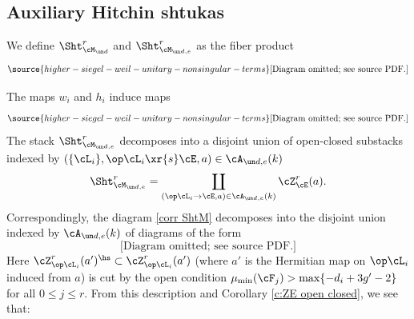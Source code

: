 


\subsection{Auxiliary Hitchin shtukas}
We define $\Sht^{r}_{\cM_{\un d}}$ and $\Sht^{r}_{\cM_{\un d,e}}$ as the fiber product
\begin{equation}\label{defn ShtMde}
\source{higher-siegel-weil-unitary-nonsingular-terms}
\text{[Diagram omitted; see source PDF.]}
\end{equation}

The maps $w_{i}$ and $h_{i}$ induce maps
\begin{equation}\label{corr ShtM}
\source{higher-siegel-weil-unitary-nonsingular-terms}
\text{[Diagram omitted; see source PDF.]}
\end{equation}
The stack $\Sht^{r}_{\cM_{\un d,e}}$ decomposes into a disjoint union of open-closed substacks indexed by $(\{\cL_{i}\}, \op\cL_{i}\xr{s} \cE, a)\in \cA_{\un d,e}(k)$
\begin{equation}
\Sht^{r}_{\cM_{\un d,e}}=\coprod_{(\op\cL_{i}\to \cE, a)\in \cA_{\un d,e}(k)}\cZ^{r}_{\cE}(a).
\end{equation}
Correspondingly, the diagram \eqref{corr ShtM} decomposes into the disjoint union indexed by $\cA_{\un d,e}(k)$ of diagrams of the form
\begin{equation}
\text{[Diagram omitted; see source PDF.]}
\end{equation}
Here $\cZ^{r}_{\op\cL_{i}}(a')^{\hs}\subset \cZ^{r}_{\op\cL_{i}}(a')$ (where $a'$ is the Hermitian map on $\op\cL_{i}$ induced from $a$) is cut by the open condition $\mu_{\min}(\cF_{j})>\max\{-d_{i}+3g'-2\}$ for all $0\le j\le r$. From this description  and Corollary \ref{c:ZE open closed}, we see that:

